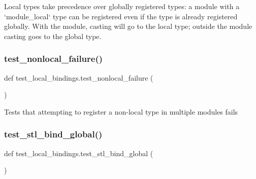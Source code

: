 \begin{DoxyVerb}Local types take precedence over globally registered types: a module with a `module_local`
type can be registered even if the type is already registered globally.  With the module,
casting will go to the local type; outside the module casting goes to the global type.\end{DoxyVerb}
 \mbox{\label{namespacetest__local__bindings_a0f2dc6fa85f74e8b754696aa20f68681}} 
\subsubsection{\texorpdfstring{test\_nonlocal\_failure()}{test\_nonlocal\_failure()}}
{\footnotesize\ttfamily def test\+\_\+local\+\_\+bindings.\+test\+\_\+nonlocal\+\_\+failure (\begin{DoxyParamCaption}{ }\end{DoxyParamCaption})}

\begin{DoxyVerb}Tests that attempting to register a non-local type in multiple modules fails\end{DoxyVerb}
 \mbox{\label{namespacetest__local__bindings_a93862ca3bfbed9b8ff63680dc7910593}} 
\subsubsection{\texorpdfstring{test\_stl\_bind\_global()}{test\_stl\_bind\_global()}}
{\footnotesize\ttfamily def test\+\_\+local\+\_\+bindings.\+test\+\_\+stl\+\_\+bind\+\_\+global (\begin{DoxyParamCaption}{ }\end{DoxyParamCaption})}

\mbox{\label{namespacetest__local__bindings_acad0e8cde4bdc9fd13a5d4c938e23e6f}} 
